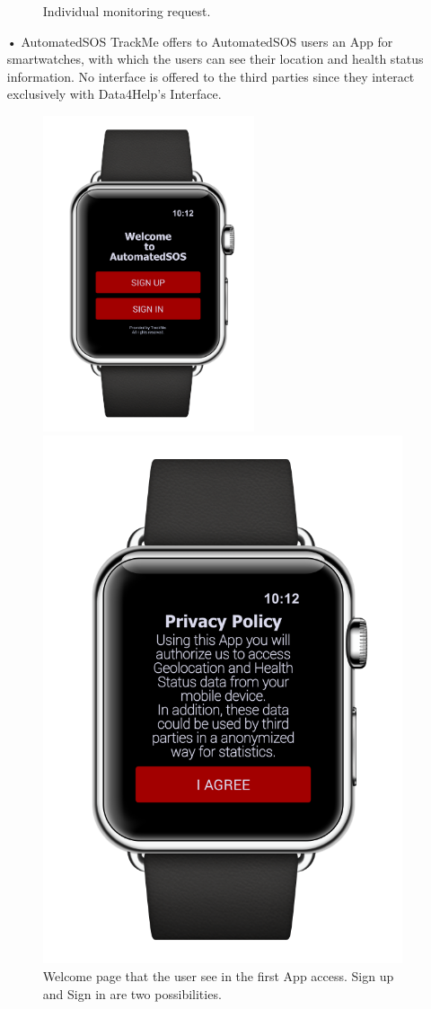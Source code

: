 \begin{enumerate}
\begin{figure}
\caption{Individual monitoring request.}
\end{figure}
\newpage
\item[•]{\Large AutomatedSOS}
\bigbreak
\noindent
TrackMe offers to AutomatedSOS users an App for smartwatches, with which the users can see their location and health status information. No interface is offered to the third parties since they interact exclusively with Data4Help's Interface. 
\begin{figure}[H]
\begin{center}
        \begin{minipage}[c]{.40\textwidth}
        \centering
          \includegraphics[height=9.3cm]{Images/Mockups/AutomatedSOSMockup1.png}
	\caption{Welcome page that the user see in the first App access. Sign up and Sign in are two possibilities.}
        \end{minipage}%
        \hspace{10mm}%
        \begin{minipage}[c]{.40\textwidth}
        \centering
          \includegraphics[height=9.3 cm]{Images/Mockups/AutomatedSOSMockup2.png}

\end{minipage}
\end{center}
\end{figure}
\end{enumerate}

